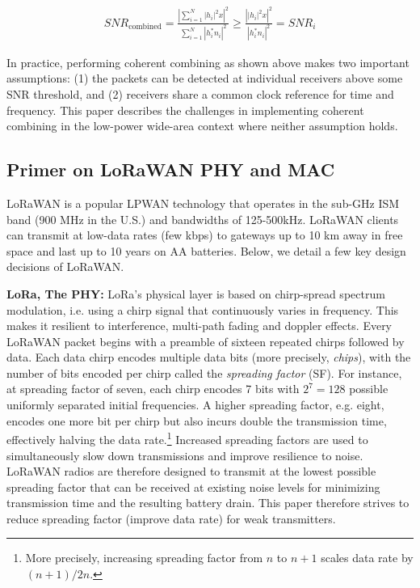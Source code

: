 \begin{align*}
SNR_{\text{combined}} %
	= \frac{\left| \sum_{i=1}^N \left| h_i \right|^2 x \right|^2}{\sum_{i=1}^N \left| h^*_i n_i \right|^2} 
	\geq \frac{\left| \left| h_i \right|^2 x \right|^2}{\left| h^*_i n_i \right|^2} = SNR_i
\end{align*}

In practice, performing coherent combining as shown above makes two important
assumptions: (1) the packets can be detected at individual receivers above
some SNR threshold, and (2) receivers share a common clock reference for time
and frequency. This paper describes the challenges in implementing coherent
combining in the low-power wide-area context where neither assumption holds.


\subsection{Primer on LoRaWAN PHY and MAC}
\label{sec:lora}

LoRaWAN is a popular LPWAN technology that operates in the sub-GHz ISM band
(900 MHz in the U.S.) and bandwidths of 125-500kHz. LoRaWAN clients can
transmit at low-data rates (few kbps) to gateways up to 10 km away in free
space and last up to 10 years on AA batteries. Below, we detail a few key
design decisions of LoRaWAN.

\noindent \textbf{LoRa, The PHY: } LoRa's physical layer is based on
chirp-spread spectrum modulation, i.e. using a chirp signal that continuously
varies in frequency. This makes it resilient to interference, multi-path
fading and doppler effects. Every LoRaWAN packet begins with a preamble of
sixteen repeated chirps followed by data. Each data chirp encodes multiple
data bits (more precisely, \textit{chips}), with the number of  bits encoded
per chirp called the \textit{spreading factor} (SF). For instance, at
spreading factor of seven, each chirp encodes 7 bits with $2^7 = 128$ possible
uniformly separated initial frequencies. A higher spreading factor, e.g.
eight, encodes one more bit per chirp but also incurs double the transmission
time, effectively halving the data rate.\footnote{More precisely, increasing
spreading factor from $n$ to $n+1$ scales data rate by $(n+1)/2n$.} Increased
spreading factors are used to simultaneously slow down transmissions and
improve resilience to noise. LoRaWAN radios are therefore designed to transmit
at the lowest possible spreading factor that can be received at existing noise
levels for minimizing transmission time and the resulting battery drain. This
paper therefore strives to reduce spreading factor (improve data rate) for
weak transmitters.

